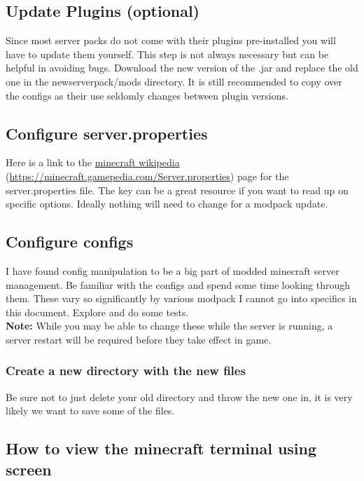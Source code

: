 \documentclass{report}
\begin{document}
\subsection{Update Plugins (optional)}
Since most server packs do not come with their plugins pre-installed you will have to update them yourself. This step is not always necessary but can be helpful in avoiding bugs. Download the new version of the .jar and replace the old one in the newserverpack/mods directory. It is still recommended to copy over the configs as their use seldomly changes between plugin versions.

\subsection{Configure server.properties}
Here is a link to the \href{https://minecraft.gamepedia.com/Server.properties}{minecraft wikipedia} (\url{https://minecraft.gamepedia.com/Server.properties}) page for the server.properties file. The key can be a great resource if you want to read up on specific options. Ideally nothing will need to change for a modpack update.

\subsection{Configure configs}
I have found config manipulation to be a big part of modded minecraft server management. Be familiar with the configs and spend some time looking through them. These vary so significantly by various modpack I cannot go into specifics in this document. Explore and do some tests.\\

\textbf{Note:} While you may be able to change these while the server is running, a server restart will be required before they take effect in game.

\subsubsection{Create a new directory with the new files}
Be sure not to just delete your old directory and throw the new one in, it is very likely we want to save some of the files.



\subsection{How to view the minecraft terminal using screen}
\end{document}
